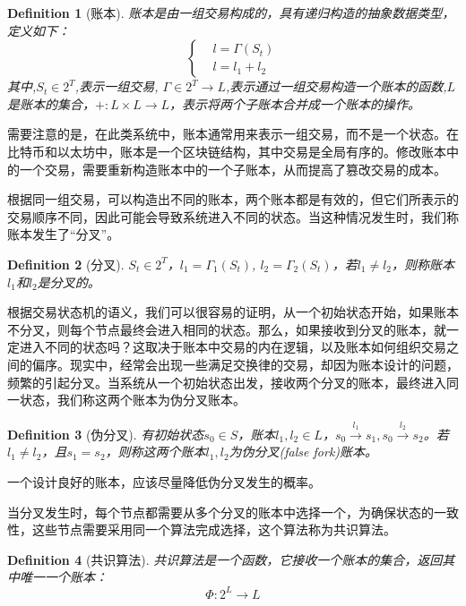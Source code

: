 \documentclass[UTF8,nofonts]{ctexart}
\newtheorem{definition}{Definition}[section]
\begin{document}
\begin{multicols}{2}
\begin{definition}[账本] \label{def-ledger}
账本是由一组交易构成的，具有递归构造的抽象数据类型，定义如下：
$$
\begin{cases}
 & l = \Gamma(S_{t})\\ 
 & l = l_{1} + l_{2}
\end{cases}
$$
其中,$S_{t} \in 2^{T}$,表示一组交易, $\Gamma \in 2^{T} \rightarrow L$,表示通过一组交易构造一个账本的函数,$L$是账本的集合，$\boldsymbol{+}: L \times L \rightarrow L$，表示将两个子账本合并成一个账本的操作。
\end{definition}

需要注意的是，在此类系统中，账本通常用来表示一组交易，而不是一个状态。在比特币\cite{nakamoto2008bitcoin}和以太坊\cite{wood2014ethereum}中，账本是一个区块链结构，其中交易是全局有序的。修改账本中的一个交易，需要重新构造账本中的一个子账本，从而提高了篡改交易的成本。

根据同一组交易，可以构造出不同的账本，两个账本都是有效的，但它们所表示的交易顺序不同，因此可能会导致系统进入不同的状态。当这种情况发生时，我们称账本发生了“分叉”。
\begin{definition}[分叉] \label{def-fork}
$S_{t} \in 2^{T}$，$l_{1}=\Gamma_{1}(S_{t})$, $l_{2}=\Gamma_{2}(S_{t})$，若$l_{1} \neq l_{2}$，则称账本$l_{1}$和$l_{2}$是分叉的。 
\end{definition}

根据交易状态机的语义，我们可以很容易的证明，从一个初始状态开始，如果账本不分叉，则每个节点最终会进入相同的状态。那么，如果接收到分叉的账本，就一定进入不同的状态吗？这取决于账本中交易的内在逻辑，以及账本如何组织交易之间的偏序。现实中，经常会出现一些满足交换律的交易，却因为账本设计的问题，频繁的引起分叉。当系统从一个初始状态出发，接收两个分叉的账本，最终进入同一状态，我们称这两个账本为伪分叉账本。

\begin{definition}[伪分叉] \label{def-falsefork}
有初始状态$s_{0} \in S$，账本$l_{1},l_{2} \in L$，$s_{0}\overset{l_{1}}{\rightarrow}s_{1}, s_{0}\overset{l_{2}}{\rightarrow}s_{2}$。若$l_{1} \neq l_{2}$，且$s_{1}=s_{2}$，则称这两个账本$l_{1} ,l_{2}$为伪分叉(false fork)账本。
\end{definition}

一个设计良好的账本，应该尽量降低伪分叉发生的概率。

当分叉发生时，每个节点都需要从多个分叉的账本中选择一个，为确保状态的一致性，这些节点需要采用同一个算法完成选择，这个算法称为共识算法。

\begin{definition}[共识算法] \label{def-consensus}
共识算法是一个函数，它接收一个账本的集合，返回其中唯一一个账本：
$$\Phi: 2^{L} \rightarrow L$$
\end{definition}


\end{multicols}
\end{document}
